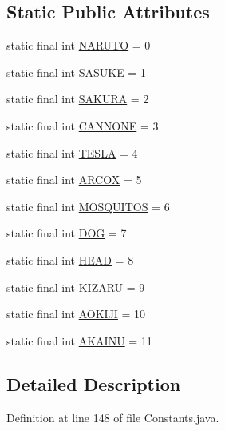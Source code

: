 \subsection*{Static Public Attributes}
\begin{DoxyCompactItemize}
\item 
static final int \hyperlink{classhelpz_1_1_constants_1_1_towers_ae561164fb0e2a2e0165e8018bcd22866}{N\+A\+R\+U\+TO} = 0
\item 
static final int \hyperlink{classhelpz_1_1_constants_1_1_towers_a6c973e2037cbb5c3eeb5cdcf013bfa3c}{S\+A\+S\+U\+KE} = 1
\item 
static final int \hyperlink{classhelpz_1_1_constants_1_1_towers_a92ce3fd96ffdf1b30c6f1fb30b3818e2}{S\+A\+K\+U\+RA} = 2
\item 
static final int \hyperlink{classhelpz_1_1_constants_1_1_towers_a25306469dc98bbb9169e169197e90430}{C\+A\+N\+N\+O\+NE} = 3
\item 
static final int \hyperlink{classhelpz_1_1_constants_1_1_towers_a4d5acad31ff3b2bae0b29f2dcc483e65}{T\+E\+S\+LA} = 4
\item 
static final int \hyperlink{classhelpz_1_1_constants_1_1_towers_af0cedf0be398127534ed0e472c106d72}{A\+R\+C\+OX} = 5
\item 
static final int \hyperlink{classhelpz_1_1_constants_1_1_towers_a281487a972bb559c8054c4ef1435c923}{M\+O\+S\+Q\+U\+I\+T\+OS} = 6
\item 
static final int \hyperlink{classhelpz_1_1_constants_1_1_towers_a66ff85e58d3516590264bd0d97e34158}{D\+OG} = 7
\item 
static final int \hyperlink{classhelpz_1_1_constants_1_1_towers_a3ec95546f9db296f3989514bd9d4c099}{H\+E\+AD} = 8
\item 
static final int \hyperlink{classhelpz_1_1_constants_1_1_towers_a8c62dc6365b182688bb405cefc367f14}{K\+I\+Z\+A\+RU} = 9
\item 
static final int \hyperlink{classhelpz_1_1_constants_1_1_towers_a37bbe4882bfdcb6cca370579d2f19a65}{A\+O\+K\+I\+JI} = 10
\item 
static final int \hyperlink{classhelpz_1_1_constants_1_1_towers_a1aee0d987bc2dc1a26b4e9e8043230a0}{A\+K\+A\+I\+NU} = 11
\end{DoxyCompactItemize}


\subsection{Detailed Description}


Definition at line 148 of file Constants.\+java.



